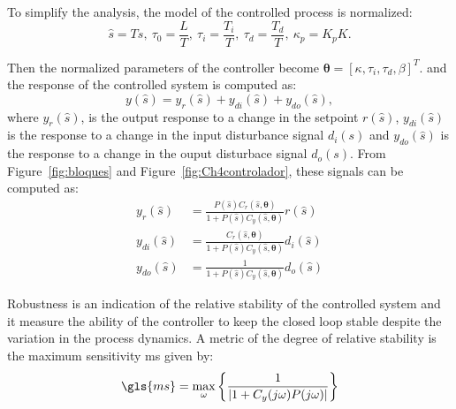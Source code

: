 To simplify the analysis, the model of the controlled process is normalized:
%
\begin{equation*}
\hat{s}= Ts, \ \tau_0=  \displaystyle\frac{L}{T}, \ \tau_i=  \displaystyle\frac{T_i}{T}, \ \tau_d = \frac{T_d}{T}, \ \kappa_p= K_p K.
\end{equation*}  %

Then the normalized parameters of the controller become $\bm{\theta}=\left[\kappa, \tau_i, \tau_d, \beta\right]^T$.
%
and the response of the controlled system is computed as: 
\begin{equation} 
 y(\hat{s})= y_r(\hat{s}) + y_{di}(\hat{s}) + y_{do}(\hat{s}),
\label{ys}
\end{equation}
%
where $y_r(\hat{s})$, is the output response to a change in the setpoint $r(\hat{s})$, $y_{di}(\hat{s})$ is the response to a change in the input disturbance signal $d_i(s)$ and $y_{do}(\hat{s})$ is the response to a change in the ouput disturbace signal $d_o(s)$. From Figure~\ref{fig:bloques} and Figure~\ref{fig:Ch4controlador}, these signals can be computed as:
%
\begin{align*}
 y_r(\hat{s}) &= \frac{P(\hat{s}) C_r(\hat{s},\bm{\theta}) }{1 + P(\hat{s}) C_y(\hat{s},\bm{\theta})} r(\hat{s})\\
y_{di}(\hat{s}) &=  \frac{C_r(\hat{s},\bm{\theta})}{1 + P(\hat{s}) C_y(\hat{s},\bm{\theta})} d_i(\hat{s}) \\%
y_{do}(\hat{s}) &= \frac{1}{1 + P(\hat{s}) C_y(\hat{s},\bm{\theta})} {d_o(\hat{s})}
\label{ytot}
\end{align*}


Robustness is an indication of the relative stability of the controlled system and it measure the ability of the controller to keep the closed loop stable despite the variation in the process dynamics. A metric of the degree of relative stability is the maximum sensitivity \gls{ms} given by:
%
\begin{equation}  %
\gls{ms}=  \max_\omega \left\{ \frac{1}{\left |{1 + C_y(j\omega ) P(j\omega )}\right |}\right\} 
\label{Ms}
\end{equation}

